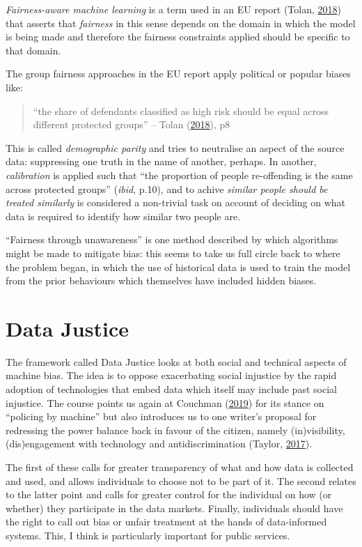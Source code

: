 \documentclass[
]{book}
\begin{document}
\emph{Fairness-aware machine learning} is a term used in an EU report (Tolan, \protect\hyperlink{ref-Tolan2018}{2018}) that asserts that \emph{fairness} in this sense depends on the domain in which the model is being made and therefore the fairness constraints applied should be specific to that domain.

The group fairness approaches in the EU report apply political or popular biases like:

\begin{quote}
``the share of defendants classified as high risk should be equal across different protected groups'' -- Tolan (\protect\hyperlink{ref-Tolan2018}{2018}), p8
\end{quote}

This is called \emph{demographic parity} and tries to neutralise an aspect of the source data: suppressing one truth in the name of another, perhaps. In another, \emph{calibration} is applied such that ``the proportion of people re-offending is the same across protected groups'' (\emph{ibid}, p.10), and to achive \emph{similar people should be treated similarly} is considered a non-trivial task on account of deciding on what data is required to identify how similar two people are.

``Fairness through unawareness'' is one method described by which algorithms might be made to mitigate bias: this seems to take us full circle back to where the problem began, in which the use of historical data is used to train the model from the prior behaviours which themselves have included hidden biases.

\hypertarget{data-justice}{%
\section{Data Justice}\label{data-justice}}

The framework called Data Justice looks at both social and technical aspects of machine bias. The idea is to oppose exacerbating social injustice by the rapid adoption of technologies that embed data which itself may include past social injustice. The course points us again at Couchman (\protect\hyperlink{ref-Couchman2019}{2019}) for its stance on ``policing by machine'' but also introduces us to one writer's proposal for redressing the power balance back in favour of the citizen, namely (in)visibility, (dis)engagement with technology and antidiscrimination (Taylor, \protect\hyperlink{ref-Taylor2017}{2017}).

The first of these calls for greater transparency of what and how data is collected and used, and allows individuals to choose not to be part of it. The second relates to the latter point and calls for greater control for the individual on how (or whether) they participate in the data markets. Finally, individuals should have the right to call out bias or unfair treatment at the hands of data-informed systems. This, I think is particularly important for public services.
\end{document}

